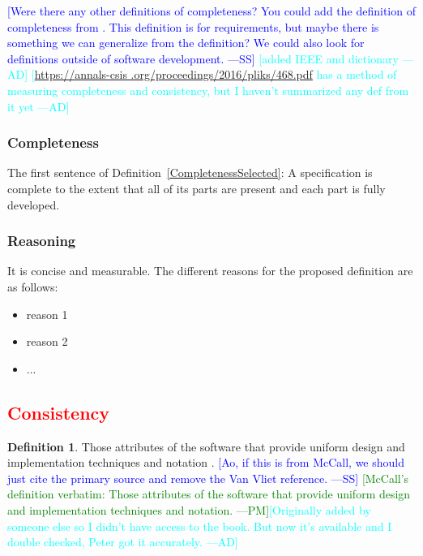 \documentclass[letterpaper, cleveref]{lipics-v2019}
\newcommand{\authornote}[3]{\textcolor{#1}{[#3 ---#2]}}
\newcommand{\authornote}[3]{}
\newcommand{\wss}[1]{\authornote{blue}{SS}{#1}} %
\newcommand{\pmi}[1]{\authornote{green}{PM}{#1}} %
\newcommand{\ad}[1]{\authornote{cyan}{AD}{#1}} %
\newcommand{\notdone}[1]{\textcolor{red}{#1}}
\theoremstyle{definition}
\newtheorem{defn}{Definition}
\begin{document}
\wss{Were there any other definitions of completeness?  You could add the
definition of completeness from \citet[p.\ 5--6]{IEEE1998}.  This definition
is for requirements, but maybe there is something we can generalize from the
definition?  We could also look for definitions outside of software
development.} \ad{added IEEE and dictionary} \ad{\url{https://annals-csis
.org/proceedings/2016/pliks/468.pdf} has a method of measuring completeness
and consistency, but I haven't summarized any def from it yet}

\begin{mybox}
\subsubsection*{Completeness} 
The first sentence of Definition~\ref{CompletenessSelected}: A specification is
complete to the extent that all of its parts are present and each part is fully
developed.
\end{mybox}

\subsubsection*{Reasoning}

It is concise and measurable.  The different reasons for the proposed definition
are as follows:

\begin{itemize}
  \item reason 1
  \item reason 2
  \item ...
\end{itemize}


\subsection{\notdone{Consistency}} %

\begin{defn}
  Those attributes of the software that provide uniform design and
  implementation techniques and notation \citep{McCallEtAl1977}.  \wss{Ao,
    if this is from McCall, we should just cite the primary source and
    remove the Van Vliet reference.} \pmi{McCall's definition verbatim:
  Those attributes of the software that provide uniform design and
  implementation techniques and notation.}\ad{Originally added by someone
  else so I didn't have access to the book. But now it's available and I
  double checked, Peter got it accurately.}
\end{defn}
\end{document}
